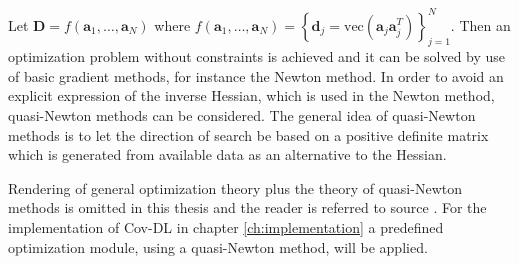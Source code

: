 Let $\textbf{D} = f(\textbf{a}_1, \hdots, \textbf{a}_N)$ where $f(\textbf{a}_1, \hdots, \textbf{a}_N) = \left\{\textbf{d}_j = \text{vec}(\textbf{a}_j\textbf{a}_j^T) \right\}_{j=1}^{N} $. Then an optimization problem without constraints is achieved and it can be solved by use of basic gradient methods, for instance the Newton method. In order to avoid an explicit expression of the inverse Hessian, which is used in the Newton method, quasi-Newton methods can be considered\cite{Optimization2007}.  
The general idea of quasi-Newton methods is to let the direction of search be based on a positive definite matrix which is generated from available data as an alternative to the Hessian. 

Rendering of general optimization theory plus the theory of quasi-Newton methods is omitted in this thesis and the reader is referred to source \cite{Optimization2007}.
For the implementation of Cov-DL in chapter \ref{ch:implementation} a predefined optimization module, using a quasi-Newton method, will be applied.   
   

